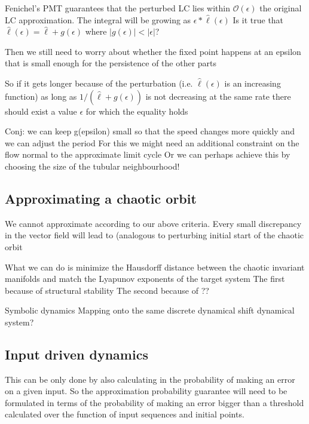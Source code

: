 \documentclass{article}
\theoremstyle{definition}
\theoremstyle{remark}
\begin{document}
Fenichel's PMT guarantees that the perturbed LC lies within $\mathcal{O}(\epsilon)$ the original LC approximation.
The integral will be growing as $\epsilon * \hat \ell(\epsilon)$
Is it true that $\hat \ell(\epsilon) = \hat \ell + g(\epsilon)$ where $|g(\epsilon)|<|\epsilon|$?

Then we still need to worry about whether the fixed point happens at an epsilon that is small enough for the persistence of the other parts


So if it gets longer because of the perturbation (i.e. $\hat \ell(\epsilon)$ is an increasing function) as long as $1/(\hat \ell+g(\epsilon))$ is not decreasing at the same rate there should exist a value $\epsilon$ for which the equality holds

Conj: we can keep g(epsilon) small so that the speed changes more quickly and we can adjust the period
For this we might need an additional constraint on the flow normal to the approximate limit cycle
Or we can perhaps achieve this by choosing the size of the tubular neighbourhood!




\subsection{Approximating a chaotic orbit}
We cannot approximate according to our above criteria.
Every small discrepancy in the vector field will lead to 
(analogous to perturbing initial start of the chaotic orbit 


What we can do is minimize the Hausdorff distance between the chaotic invariant manifolds and match the Lyapunov exponents of the target system
The first because of structural stability
The second because of ??


Symbolic dynamics
Mapping onto the same discrete dynamical shift dynamical system?





\subsection{Input driven dynamics}

This can be only done by also calculating in the probability of making an error on a given input.
So the approximation probability guarantee will need to be formulated in terms of the probability of making an error bigger than a threshold calculated over the function of input sequences and initial points.
\end{document}
